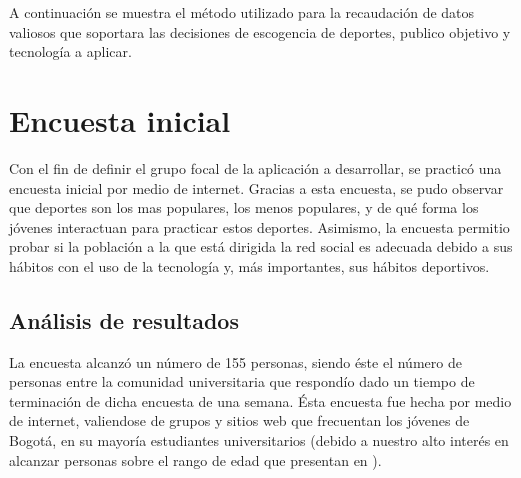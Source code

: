 A continuación se muestra el método utilizado para la recaudación de datos valiosos que soportara las decisiones de escogencia de deportes, publico objetivo y tecnología a aplicar.

\section{Encuesta inicial}

Con el fin de definir el grupo focal de la aplicación a desarrollar, se practicó una encuesta inicial por medio de internet. Gracias a esta encuesta, se pudo observar que deportes son los mas populares, los menos populares, y de qué forma los jóvenes interactuan para practicar estos deportes. Asimismo, la encuesta permitio probar si la población a la que está dirigida la red social es adecuada debido a sus hábitos con el uso de la tecnología y, más importantes, sus hábitos deportivos.

\subsection{Análisis de resultados}

La encuesta alcanzó un número de 155 personas, siendo éste el número de personas entre la comunidad universitaria que respondío dado un tiempo de terminación de dicha encuesta de una semana. Ésta encuesta fue hecha por medio de internet, valiendose de grupos y sitios web que frecuentan los jóvenes de Bogotá, en su mayoría estudiantes universitarios (debido a nuestro alto interés en alcanzar personas sobre el rango de edad que presentan en \cite{user_behavior_online}).\\

